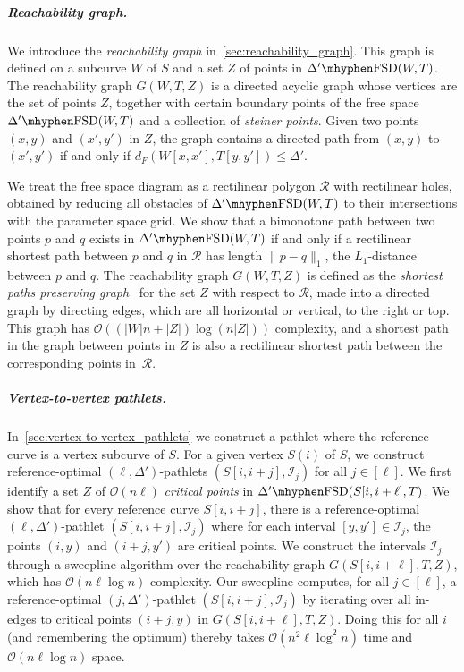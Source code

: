 \documentclass[a4paper,UKenglish,cleveref,thm-restate,notab]{lipics-v2021}
\newcommand{\FSD}[1][\Delta'] {\ensuremath{#1}\mhyphen\mathrm{FSD}}
\newcommand{\bigO}{\mathcal{O}}
\newcommand{\I}{\mathcal{I}}
\begin{document}
            \subparagraph*{Reachability graph.} We introduce the \emph{reachability graph} in~\cref{sec:reachability_graph}.
            This graph is defined on a subcurve $W$ of $S$ and a set $Z$ of points in $\FSD(W, T)$.
            The reachability graph $G(W, T, Z)$ is a directed acyclic graph whose vertices are the set of points $Z$, together with certain boundary points of the free space $\FSD(W, T)$ and a collection of \emph{steiner points}.
            Given two points $(x, y)$ and $(x', y')$ in $Z$, the graph contains a directed path from $(x, y)$ to $(x', y')$ if and only if $d_F(W[x, x'], T[y, y']) \leq \Delta'$.

            We treat the free space diagram as a rectilinear polygon $\mathcal{R}$ with rectilinear holes, obtained by reducing all obstacles of $\FSD(W, T)$ to their intersections with the parameter space grid.
            We show that a bimonotone path between two points $p$ and $q$ exists in $\FSD(W, T)$ if and only if a rectilinear shortest path between $p$ and $q$ in $\mathcal{R}$ has length $\lVert p-q \rVert_1$, the $L_1$-distance between $p$ and $q$.
            The reachability graph $G(W, T, Z)$ is defined as the \emph{shortest paths preserving graph}~\cite{widmayer91rectilinear_graphs} for the set $Z$ with respect to $\mathcal{R}$, made into a directed graph by directing edges, which are all horizontal or vertical, to the right or top.
            This graph has $\bigO((|W|n + |Z|) \log (n|Z|))$ complexity, and a shortest path in the graph between points in $Z$ is also a rectilinear shortest path between the corresponding points in~$\mathcal{R}$.

            \subparagraph*{Vertex-to-vertex pathlets.} In~\cref{sec:vertex-to-vertex_pathlets} we construct a pathlet where the reference curve is a vertex subcurve of $S$.
            For a given vertex $S(i)$ of $S$, we construct reference-optimal $(\ell, \Delta')$-pathlets $(S[i, i+j], \I_j)$ for all $j \in [\ell]$.
            We first identify a set $Z$ of $\bigO(n \ell)$ \emph{critical points} in $\FSD(S[i, i+\ell], T)$.
            We show that for every reference curve $S[i, i+j]$, there is a reference-optimal $(\ell, \Delta')$-pathlet $(S[i, i+j], \I_j)$ where for each interval $[y, y'] \in \I_j$, the points $(i, y)$ and $(i+j, y')$ are critical points.
            We construct the intervals $\I_j$ through a sweepline algorithm over the reachability graph $G(S[i, i+\ell], T, Z)$, which has $\bigO(n \ell \log n)$ complexity.
            Our sweepline computes, for all $j \in [\ell]$, a reference-optimal $(j, \Delta')$-pathlet $(S[i, i+j], \I_j)$ by iterating over all in-edges to critical points $(i+j, y)$ in $G(S[i, i+\ell], T, Z)$.
            Doing this for all $i$ (and remembering the optimum)
            thereby takes $\bigO(n^2 \ell \log^2 n)$ time and $\bigO(n \ell \log n)$ space.
\end{document}
